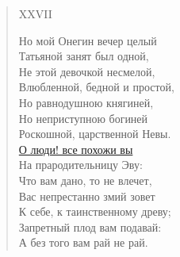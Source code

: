 \begin{verse}
XXVII

Но мой Онегин вечер целый\\
Татьяной занят был одной,\\
Не этой девочкой несмелой,\\
Влюбленной, бедной и простой,\\
Но равнодушною княгиней,\\
Но неприступною богиней\\
Роскошной, царственной Невы.\\
\hyperref[eva]{О люди! все похожи вы}\\
На прародительницу Эву:\\
Что вам дано, то не влечет,\\
Вас непрестанно змий зовет\\
К себе, к таинственному древу;\\
Запретный плод вам подавай:\\
А без того вам рай не рай.


\end{verse}
